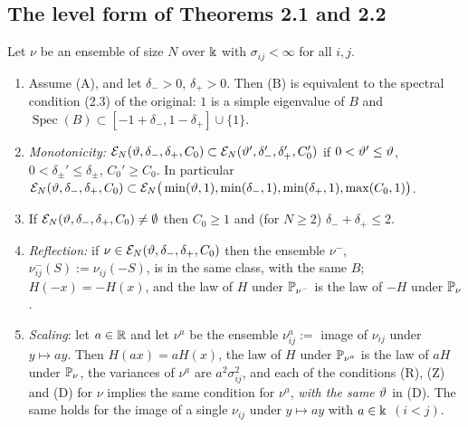 \subsection{The level form of Theorems 2.1 and 2.2}
\begin{lemma}\label{lem:mono}
Let $\nu$ be an ensemble of size $N$ over $\Bbbk$ with $\sigma_{ij}<\infty$ for all $i,j$.
\begin{enumerate}[label=\textup{(\roman*)},leftmargin=2.2em,itemsep=1pt]
\item Assume \textup{(A)}, and let $\delta_->0$, $\delta_+>0$. Then \textup{(B)} is equivalent to the spectral condition \textup{(2.3)} of the original:
$1$ is a simple eigenvalue of $B$ and $\operatorname{Spec}(B)\subset[-1+\delta_-,1-\delta_+]\cup\{1\}$.
\item \emph{Monotonicity:} $\mathcal E_N(\vartheta,\delta_-,\delta_+,C_0)\subset\mathcal E_N(\vartheta',\delta_-',\delta_+',C_0')$ if
$0<\vartheta'\le\vartheta$, $0<\delta_\pm'\le\delta_\pm$, $C_0'\ge C_0$. In particular
$\mathcal E_N(\vartheta,\delta_-,\delta_+,C_0)\subset\mathcal E_N\big(\min(\vartheta,1),\min(\delta_-,1),\min(\delta_+,1),\max(C_0,1)\big)$.
\item If $\mathcal E_N(\vartheta,\delta_-,\delta_+,C_0)\ne\emptyset$ then $C_0\ge1$ and (for $N\ge2$) $\delta_-+\delta_+\le2$.
\item \emph{Reflection:} if $\nu\in\mathcal E_N(\vartheta,\delta_-,\delta_+,C_0)$ then the ensemble $\nu^-$, $\nu^-_{ij}(S):=\nu_{ij}(-S)$, is in the same class, with the same $B$;
$H(-x)=-H(x)$, and the law of $H$ under $\mathbb{P}_{\nu^-}$ is the law of $-H$ under $\mathbb{P}_\nu$.
\item \emph{Scaling}: let $a\in\mathbb{R}$ and let $\nu^{a}$ be the ensemble $\nu^a_{ij}:=$ image of $\nu_{ij}$ under $y\mapsto ay$. Then $H(ax)=aH(x)$, the law of $H$ under $\mathbb{P}_{\nu^a}$ is the law of $aH$ under $\mathbb{P}_\nu$,
the variances of $\nu^a$ are $a^2\sigma_{ij}^2$, and each of the conditions \textup{(R)}, \textup{(Z)} and \textup{(D)} for $\nu$ implies the same condition for $\nu^a$,
\emph{with the same $\vartheta$} in \textup{(D)}. The same holds for the image of a single $\nu_{ij}$ under $y\mapsto ay$ with $a\in\Bbbk$ $(i<j)$.
\end{enumerate}
\end{lemma}

